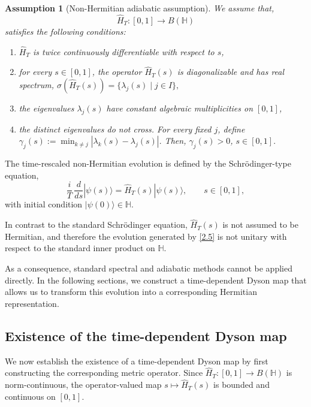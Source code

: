 \documentclass[pdflatex,sn-mathphys-num]{sn-jnl}
\theoremstyle{thmstyleone}
\theoremstyle{thmstyletwo}
\theoremstyle{thmstylethree}
\newtheorem{assumption}[theorem]{Assumption}
\begin{document}
\begin{assumption}[Non-Hermitian adiabatic assumption]
\label{Ass:NonHermitianAdiabatic}
We assume that,
\[
\hat H_T:[0,1]\longrightarrow B(\mathbb H)
\]
satisfies the following conditions:
\begin{enumerate}
\item \(\hat H_T\) is twice continuously differentiable with respect to \(s\),

\item for every \(s\in[0,1]\), the operator \(\hat H_T(s)\) is diagonalizable and has real spectrum, $\sigma(\hat H_T(s))
=
\{\lambda_j(s)\mid j\in I\},$

\item the eigenvalues \(\lambda_j(s)\) have constant algebraic multiplicities on \([0,1]\),

\item the distinct eigenvalues do not cross. For every fixed \(j\), define $\gamma_j(s)
:=
\min_{k\neq j}
|\lambda_k(s)-\lambda_j(s)|.$
Then, $\gamma_j(s)>0$, $s\in[0,1].$

\end{enumerate}
\end{assumption}

The time-rescaled non-Hermitian evolution is defined by the Schr\"odinger-type equation,
\begin{equation}\label{2.5}
\frac{i}{T}\,\frac{d}{ds}|\psi(s)\rangle = \hat H_T(s)|\psi(s)\rangle, \qquad s \in [0,1],
\end{equation}
with initial condition $|\psi(0)\rangle \in \mathbb{H}$.

In contrast to the standard Schr\"odinger equation, $\hat H_T(s)$ is not assumed to be
Hermitian, and therefore the evolution generated by \eqref{2.5} is not unitary with
respect to the standard inner product on $\mathbb{H}$.

As a consequence, standard spectral and adiabatic methods cannot be applied directly.
In the following sections, we construct a time-dependent Dyson map that allows us to
transform this evolution into a corresponding Hermitian representation.

\subsection{Existence of the time-dependent Dyson map}

We now establish the existence of a time-dependent Dyson map by first constructing the
corresponding metric operator. Since $\hat H_T:[0,1]\to B(\mathbb{H})$ is norm-continuous, the operator-valued map
$s\mapsto \hat H_T(s)$ is bounded and continuous on $[0,1]$.
\end{document}
